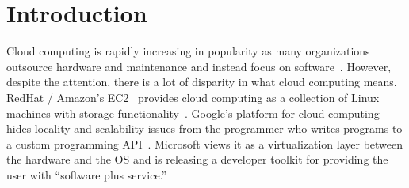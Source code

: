 \section{Introduction}

Cloud computing is rapidly increasing in popularity as many organizations
outsource hardware and maintenance and instead focus on 
software~\cite{AmazonEC2, AmazonS3, GoogleAppEngine, GoogleDocs, HPCloud, 
IBMBlueCloud, MicrosoftMemo}.   
However, despite the attention, there is a lot of disparity in what
cloud computing means. RedHat / Amazon's EC2~\cite{AmazonEC2} provides
cloud computing as a collection of Linux machines with storage
functionality~\cite{AmazonS3}. Google's platform for cloud computing
hides locality and scalability issues from the programmer who writes
programs to a custom programming API~\cite{GoogleAppEngine}. Microsoft
views it as a virtualization layer between the hardware and the OS and
is releasing a developer toolkit for providing the user with
``software plus service.''~\cite{MicrosoftMemo}

